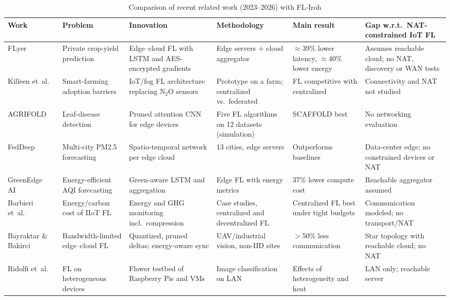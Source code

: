\documentclass[a4paper,fleqn]{cas-dc}
\begin{document}
\begin{table}[!t]
\centering
\caption{Comparison of recent related work (2023--2026) with FL-Iroh}
\label{tab:related}
\scriptsize
\renewcommand{\arraystretch}{1.15}
\setlength{\tabcolsep}{3pt}
\begin{tabular}{@{}p{1.75cm} p{2.6cm} p{3.0cm} p{2.9cm} p{2.6cm} p{3.6cm}@{}}
\toprule
\textbf{Work} & \textbf{Problem} & \textbf{Innovation} & \textbf{Methodology} & \textbf{Main result} & \textbf{Gap w.r.t.\ NAT-constrained IoT FL} \\
\midrule
FLyer~\cite{dey2025} & Private crop-yield prediction & Edge--cloud FL with LSTM and AES-encrypted gradients & Edge servers + cloud aggregator & $\approx$39\% lower latency, $\approx$40\% lower energy & Assumes reachable cloud; no NAT, discovery or WAN tests \\
Killeen et~al.~\cite{killeen2025} & Smart-farming adoption barriers & IoT/fog FL architecture replacing N$_2$O sensors & Prototype on a farm; centralized vs.\ federated & FL competitive with centralized & Connectivity and NAT not studied \\
AGRIFOLD~\cite{piccialli2025} & Leaf-disease detection & Pruned attention CNN for edge devices & Five FL algorithms on 12 datasets (simulation) & SCAFFOLD best & No networking evaluation \\
FedDeep~\cite{hu2024} & Multi-city PM2.5 forecasting & Spatio-temporal network per edge cloud & 13 cities, edge servers & Outperforms baselines & Data-center edge; no constrained devices or NAT \\
GreenEdge AI~\cite{dey2026} & Energy-efficient AQI forecasting & Green-aware LSTM and aggregation & Edge FL with energy metrics & 37\% lower compute cost & Reachable aggregator assumed \\
Barbieri et~al.~\cite{barbieri2025} & Energy/carbon cost of IIoT FL & Energy and GHG monitoring incl.\ compression & Case studies, centralized and decentralized FL & Centralized FL best under tight budgets & Communication modeled; no transport/NAT \\
Bayraktar \& Bakirci~\cite{bayraktar2026} & Bandwidth-limited edge--cloud FL & Quantized, pruned deltas; energy-aware sync & UAV/industrial vision, non-IID sites & $>$50\% less communication & Star topology with reachable cloud; no NAT \\
Ridolfi et~al.~\cite{ridolfi2023} & FL on heterogeneous devices & Flower testbed of Raspberry Pis and VMs & Image classification on LAN & Effects of heterogeneity and heat & LAN only; reachable server \\

\end{tabular}
\end{table}
\end{document}
